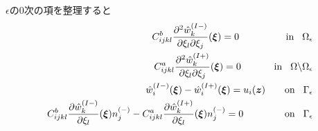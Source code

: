 $\epsilon$の0次の項を整理すると
\begin{align}
	C_{ijkl}^{b} \frac{\partial^2 \hat{w}^{(I-)}_{k}} {\partial \xi_l \partial \xi_j}(\bm{\xi})=0
	\hspace{1.7cm}\text{in}\hspace{0.3cm}\Omega_{\epsilon}
	\label{eq:GovDisturIn1}
	\\
	C_{ijkl}^{a} \frac{\partial^2 \hat{w}^{(I+)}_{k}} {\partial \xi_l \partial \xi_j}(\bm{\xi})=0
	\hspace{1.2cm}\text{in}\hspace{0.3cm}\Omega\backslash\Omega_{\epsilon}
	\label{eq:GovDisturOut1}
	\\
	\hat{w}_{i}^{(I-)}(\bm{\xi})-\hat{w}_{i}^{(I+)}(\bm{\xi})=u_{i}(\bm{z})
	\hspace{0.7cm}\text{on}\hspace{0.3cm}\Gamma_{\epsilon}
	\label{eq:GovDisturUBC1}
	\\
	C_{ijkl}^{b}\frac{\partial \hat{w}^{(I-)}_{k}} {\partial \xi_l}(\bm{\xi})n_{j}^{(-)}
	-C_{ijkl}^{a}\frac{\partial \hat{w}^{(I+)}_{k}} {\partial \xi_l}(\bm{\xi})n_{j}^{(-)}=0
	\hspace{1.5cm}\text{on}\hspace{0.3cm}\Gamma_{\epsilon}
	\label{eq:GovDisturSBC1}
\end{align}

